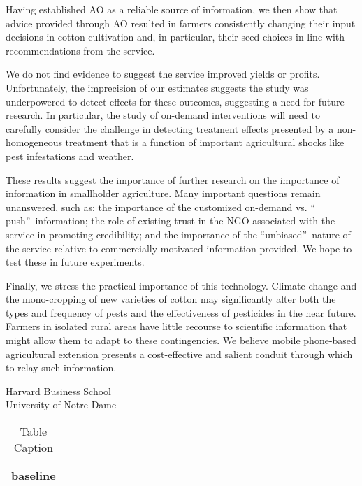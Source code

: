 \documentclass[12pt]{article}
\begin{document}
{\normalsize Having established AO as a reliable source of information, we
then show that advice provided through AO resulted in farmers consistently
changing their input decisions in cotton cultivation and, in particular, their seed choices in line with recommendations from the service. } 

{\normalsize We do not find evidence to suggest the service improved yields or profits. Unfortunately, the imprecision of our estimates suggests the study was underpowered to detect effects for these outcomes, suggesting a need for future research. In particular, the study of on-demand interventions will need to carefully consider the challenge in detecting treatment effects presented by a non-homogeneous treatment that is a function of important agricultural shocks like pest infestations and weather. }

{\normalsize These results suggest the importance of further research on the importance of information in smallholder
agriculture. Many important questions remain unanswered, such as: the
importance of the customized on-demand vs. \textquotedblleft
push\textquotedblright\ information; the role of existing trust in the NGO
associated with the service in promoting credibility; and the importance of
the \textquotedblleft unbiased\textquotedblright\ nature of the service
relative to commercially motivated information provided. We hope to test
these in future experiments.}

{\normalsize Finally, we stress the practical importance of this technology.
Climate change and the mono-cropping of new varieties of cotton may
significantly alter both the types and frequency of pests and the
effectiveness of pesticides in the near future. Farmers in isolated rural
areas have little recourse to scientific information that might allow them
to adapt to these contingencies. We believe mobile phone-based agricultural
extension presents a cost-effective and salient conduit through which to
relay such information.\vspace{50pt} }\

\noindent
Harvard Business School \\
University of Notre Dame

\newpage




{\normalsize \newpage{} }

{\normalsize \setcounter{table}{0} \renewcommand{\thetable}{\arabic{table}} }

{\normalsize 
\begin{table}[tbp]
{\normalsize \centering
\begin{tabular}{|l|}
\hline
\textbf{baseline} \\ \hline
\end{tabular}
}
\caption{Table Caption}
\label{baseline}
\end{table}
}
\end{document}
